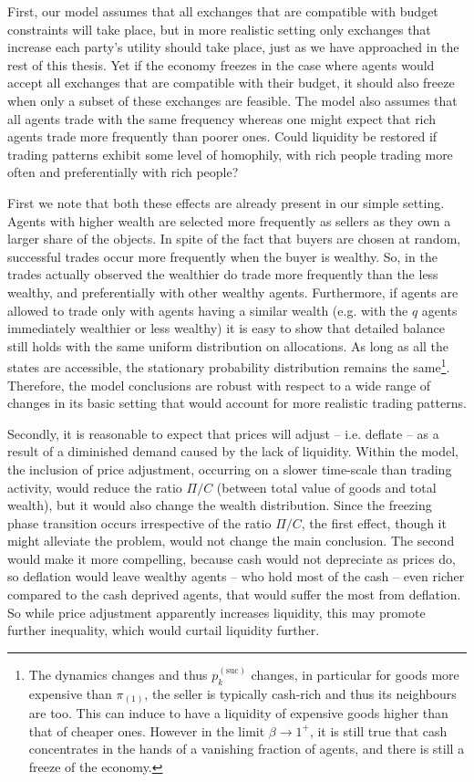 First, our model assumes that all exchanges that are compatible with budget constraints will take place, but in more realistic setting only exchanges that increase each party's utility should take place, just as we have approached in the rest of this thesis. Yet if the economy freezes in the case where agents would accept all exchanges that are compatible with their budget, it should also freeze when only a subset of these exchanges are feasible. The model also assumes that all agents trade with the same frequency whereas one might expect that rich agents trade more frequently than poorer ones. Could liquidity be restored if trading patterns exhibit some level of homophily, with rich people trading more often and preferentially with rich people? 

First we note that both these effects are already present in our simple setting. Agents with higher wealth are selected more frequently as sellers as they own a larger share of the objects. In spite of the fact that buyers are chosen at random, successful trades occur more frequently when the buyer is wealthy. So, in the trades actually observed the wealthier do trade more frequently than the less wealthy, and preferentially with other wealthy agents. Furthermore, if agents are allowed to trade only with agents having a similar wealth (e.g. with the $q$ agents immediately wealthier or less wealthy) it is easy to show that detailed balance still holds with the same uniform distribution on allocations. As long as all the states are accessible, the stationary probability distribution remains the same\footnote{
The dynamics changes and thus $p_k^{(\text{suc})}$ changes, in particular for goods more expensive than $\pi_{(1)}$, the seller is typically cash-rich and thus its neighbours are too. This can induce to have a liquidity of expensive goods higher than that of cheaper ones. However in the limit $\beta \to 1^{+}$, it is still true that cash concentrates in the hands of a vanishing fraction of agents, and there is still a freeze of the economy.}. Therefore, the model conclusions are robust with respect to a wide range of changes in its basic setting that would account for more realistic trading patterns. 

Secondly, it is reasonable to expect that prices will adjust -- i.e. deflate -- as a result of a diminished demand caused by the lack of liquidity. Within the model, the inclusion of price adjustment, occurring on a slower time-scale than trading activity, would reduce the ratio $\Pi/C$ (between total value of goods and total wealth), but it would also change the wealth distribution. Since the freezing phase transition occurs irrespective of the ratio $\Pi/C$, the first effect, though it might alleviate the problem, would not change the main conclusion. The second would make it more compelling, because cash would not depreciate as prices do, so deflation would leave 
wealthy agents -- who hold most of the cash -- even richer compared to the cash deprived agents, that would suffer the most from deflation. So while price adjustment apparently increases liquidity, this may promote further inequality, which would curtail liquidity further. 

